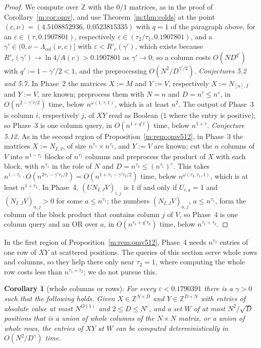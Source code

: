 \documentclass[11pt]{article}
\newtheorem{corollary}[theorem]{Corollary}
\theoremstyle{definition}
\theoremstyle{remark}
\newcommand{\Z}{\mathbb{Z}}
\newcommand{\HintedOMvRtwenty}{0.1907801}%
\newcommand{\ColRangeHalf}{0.1790391}%
\begin{document}
\begin{proof}
We compute over $\Z$ with the $0/1$ matrices, as in the proof of Corollary~\ref{m:cor:omv}, and use Theorem~\ref{m:thm:colds} at the point $(c,\nu)=(4.5108852936,\,0.0523815335)$ with $q=1$ of the paragraph above, for an $\varepsilon\in(\tau,\HintedOMvRtwenty)$, respectively $\varepsilon\in(\tau_2/\tau_1,\HintedOMvRtwenty)$, and a $\gamma'\in(0,\nu-\Lambda_{\mathrm{col}}(\nu,c)]$ with $\varepsilon<R'_c(\gamma')$, which exists because $R'_c(\gamma')\to\ln4/A(c)>\HintedOMvRtwenty$ as $\gamma'\to0$; so a column costs $O(ND^{q'})$ with $q':=1-\gamma'/2<1$, and the preprocessing $O(N^2/D^{\gamma'/2})$. \emph{Conjectures 5.2 and 5.7.} In Phase~2 the matrices $X:=M$ and $Y:=V$, respectively $X:=N_{[n],I}$ and $Y:=V$, are known; preprocess them with $N=n$ and $D=n^\tau\le n^\varepsilon$, in $O(n^{2-\gamma'\tau/2})$ time, below $n^{\omega(1,\tau,1)}$, which is at least $n^2$. The output of Phase~3 is column $i$, respectively $j$, of $XY$ read as Boolean ($1$ where the entry is positive), so Phase~3 is one column query, in $O(n^{1+q'\tau})$ time, below $n^{1+\tau}$. \emph{Conjecture 5.12.} As in the second region of Proposition~\ref{m:rem:omv512}, in Phase~3 the matrices $X:=N_{I,J}$, of size $n^{\tau_1}\times n^{\tau_2}$, and $Y:=V$ are known; cut the $n$ columns of $V$ into $n^{1-\tau_1}$ blocks of $n^{\tau_1}$ columns and preprocess the product of $X$ with each block, with $n^{\tau_1}$ in the role of $N$ and $D=n^{\tau_2}\le(n^{\tau_1})^\varepsilon$. This takes $n^{1-\tau_1}\cdot O(n^{2\tau_1-\gamma'\tau_2/2})=O(n^{1+\tau_1-\gamma'\tau_2/2})$ time, below $n^{\omega(\tau_2,\tau_1,1)}$, which is at least $n^{1+\tau_1}$. In Phase~4, $(UN_{I,J}V)_{i,j}$ is $1$ if and only if $U_{i,a}=1$ and $(N_{I,J}V)_{a,j}>0$ for some $a\le n^{\tau_1}$; the numbers $(N_{I,J}V)_{a,j}$, $a\le n^{\tau_1}$, form the column of the block product that contains column $j$ of $V$, so Phase~4 is one column query and an OR over $a$, in $O(n^{\tau_1+q'\tau_2})$ time, below $n^{\tau_1+\tau_2}$.
\end{proof}

In the first region of Proposition~\ref{m:rem:omv512}, Phase~4 needs $n^{\tau_2}$ entries of one row of $XY$ at scattered positions. The queries of this section serve whole rows and columns, so they help there only near $\tau_2=1$, where computing the whole row costs less than $n^{\tau_1+\tau_2}$; we do not pursue this.

\begin{corollary}[whole columns or rows]\label{m:cor:colW}
For every $\varepsilon<\ColRangeHalf$ there is a $\gamma>0$ such that the following holds. Given $X\in\Z^{N\times D}$ and $Y\in\Z^{D\times N}$ with entries of absolute value at most $N^{O(1)}$ and $2\le D\le N^\varepsilon$, and a set $W$ of at most $N^2/\sqrt D$ positions that is a union of whole columns of the $N\times N$ matrix, or a union of whole rows, the entries of $XY$ at $W$ can be computed deterministically in $O(N^2/D^\gamma)$ time.
\end{corollary}
\end{document}
